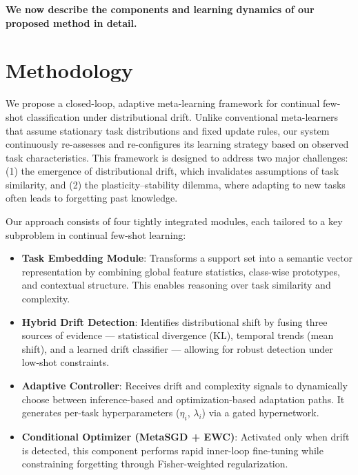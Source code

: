\documentclass[conference]{IEEEtran}
\begin{document}
\vspace{0.5em}
\noindent\textbf{We now describe the components and learning dynamics of our proposed method in detail.}


\section{Methodology}

We propose a closed-loop, adaptive meta-learning framework for continual few-shot classification under distributional drift. Unlike conventional meta-learners that assume stationary task distributions and fixed update rules, our system continuously re-assesses and re-configures its learning strategy based on observed task characteristics. This framework is designed to address two major challenges: (1) the emergence of distributional drift, which invalidates assumptions of task similarity, and (2) the plasticity–stability dilemma, where adapting to new tasks often leads to forgetting past knowledge.

Our approach consists of four tightly integrated modules, each tailored to a key subproblem in continual few-shot learning:

\begin{itemize}
    \item \textbf{Task Embedding Module}: Transforms a support set into a semantic vector representation by combining global feature statistics, class-wise prototypes, and contextual structure. This enables reasoning over task similarity and complexity.

    \item \textbf{Hybrid Drift Detection}: Identifies distributional shift by fusing three sources of evidence — statistical divergence (KL), temporal trends (mean shift), and a learned drift classifier — allowing for robust detection under low-shot constraints.

    \item \textbf{Adaptive Controller}: Receives drift and complexity signals to dynamically choose between inference-based and optimization-based adaptation paths. It generates per-task hyperparameters ($\eta_i$, $\lambda_i$) via a gated hypernetwork.

    \item \textbf{Conditional Optimizer (MetaSGD + EWC)}: Activated only when drift is detected, this component performs rapid inner-loop fine-tuning while constraining forgetting through Fisher-weighted regularization.
\end{itemize}
\end{document}
